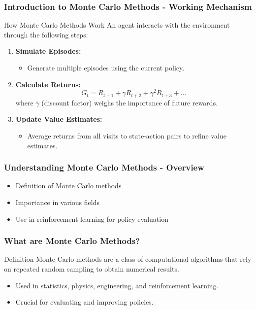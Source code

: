 \documentclass[aspectratio=169]{beamer}
\begin{document}
\begin{frame}[fragile]
    \frametitle{Introduction to Monte Carlo Methods - Working Mechanism}
    \begin{block}{How Monte Carlo Methods Work}
        An agent interacts with the environment through the following steps:
        \begin{enumerate}
            \item \textbf{Simulate Episodes:} 
            \begin{itemize}
                \item Generate multiple episodes using the current policy.
            \end{itemize}
            \item \textbf{Calculate Returns:} 
            \begin{equation}
                G_t = R_{t+1} + \gamma R_{t+2} + \gamma^2 R_{t+3} + \ldots
            \end{equation}
            where $\gamma$ (discount factor) weighs the importance of future rewards.
            \item \textbf{Update Value Estimates:}
            \begin{itemize}
                \item Average returns from all visits to state-action pairs to refine value estimates.
            \end{itemize}
        \end{enumerate}
    \end{block}
\end{frame}

\begin{frame}[fragile]
    \frametitle{Understanding Monte Carlo Methods - Overview}
    \begin{itemize}
        \item Definition of Monte Carlo methods
        \item Importance in various fields
        \item Use in reinforcement learning for policy evaluation
    \end{itemize}
\end{frame}

\begin{frame}[fragile]
    \frametitle{What are Monte Carlo Methods?}
    \begin{block}{Definition}
        Monte Carlo methods are a class of computational algorithms that rely on repeated random sampling to obtain numerical results.
    \end{block}
    \begin{itemize}
        \item Used in statistics, physics, engineering, and reinforcement learning.
        \item Crucial for evaluating and improving policies.
    \end{itemize}
\end{frame}
\end{document}
